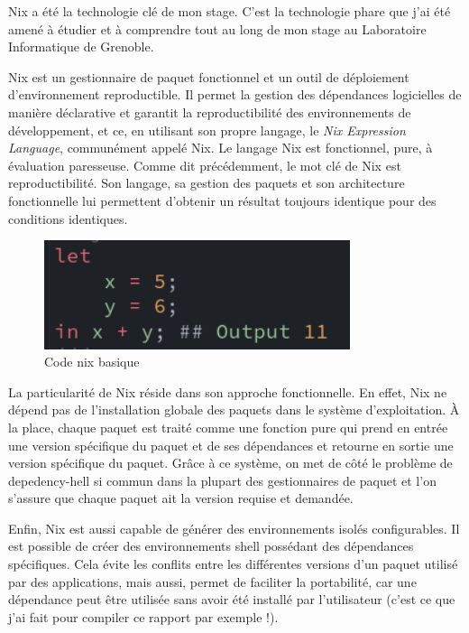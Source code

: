 \documentclass[a4paper,french,12pt, titlepage]{article}
\begin{document}
Nix a été la technologie clé de mon stage. C'est la technologie phare
que j'ai été amené à étudier et à comprendre tout au long de mon stage
au Laboratoire Informatique de Grenoble.\newline

Nix est un gestionnaire de paquet fonctionnel et un outil de déploiement
d'environnement reproductible. Il permet la gestion des dépendances
logicielles de manière déclarative et garantit la reproductibilité des
environnements de développement, et ce, en utilisant son propre langage,
le \emph{Nix Expression Language}, communément appelé Nix. Le langage
Nix est fonctionnel, pure, à évaluation paresseuse. Comme dit
précédemment, le mot clé de Nix est reproductibilité. Son langage, sa
gestion des paquets et son architecture fonctionnelle lui permettent
d'obtenir un résultat toujours identique pour des conditions
identiques.\newline

\begin{figure}[h]
\centering
\includegraphics[width=0.8\textwidth,height=0.8\textheight,keepaspectratio]{images/codebasenixdark.png}
\caption{Code nix basique}
\end{figure}

La particularité de Nix réside dans son approche fonctionnelle. En
effet, Nix ne dépend pas de l'installation globale des paquets dans le
système d'exploitation. À la place, chaque paquet est traité comme une
fonction pure qui prend en entrée une version spécifique du paquet et de
ses dépendances et retourne en sortie une version spécifique du paquet.
Grâce à ce système, on met de côté le problème de \Gls{depedency-hell}
\cite{dll2018} si commun dans la plupart des gestionnaires de paquet et
l'on s'assure que chaque paquet ait la version requise et
demandée.\newline

Enfin, Nix est aussi capable de générer des environnements isolés
configurables. Il est possible de créer des environnements shell
possédant des dépendances spécifiques. Cela évite les conflits entre les
différentes versions d'un paquet utilisé par des applications, mais
aussi, permet de faciliter la portabilité, car une dépendance peut être
utilisée sans avoir été installé par l'utilisateur (c'est ce que j'ai
fait pour compiler ce rapport par exemple !).\newline
\end{document}
